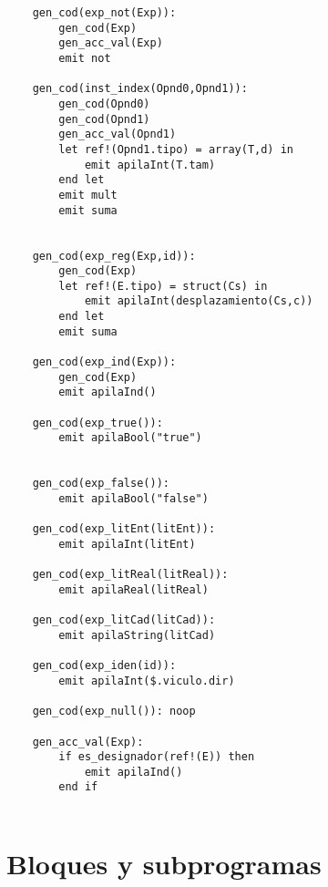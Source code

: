 \begin{lstlisting}
    gen_cod(exp_not(Exp)):
        gen_cod(Exp)
        gen_acc_val(Exp)
        emit not

    gen_cod(inst_index(Opnd0,Opnd1)):
        gen_cod(Opnd0)
        gen_cod(Opnd1)
        gen_acc_val(Opnd1)
        let ref!(Opnd1.tipo) = array(T,d) in
            emit apilaInt(T.tam)
        end let
        emit mult
        emit suma


    gen_cod(exp_reg(Exp,id)):
        gen_cod(Exp)
        let ref!(E.tipo) = struct(Cs) in
            emit apilaInt(desplazamiento(Cs,c))
        end let
        emit suma

    gen_cod(exp_ind(Exp)):
        gen_cod(Exp)
        emit apilaInd()

    gen_cod(exp_true()):
        emit apilaBool("true")


    gen_cod(exp_false()):
        emit apilaBool("false")

    gen_cod(exp_litEnt(litEnt)):
        emit apilaInt(litEnt)

    gen_cod(exp_litReal(litReal)):
        emit apilaReal(litReal)

    gen_cod(exp_litCad(litCad)):
        emit apilaString(litCad)

    gen_cod(exp_iden(id)):
        emit apilaInt($.viculo.dir)

    gen_cod(exp_null()): noop

    gen_acc_val(Exp):
        if es_designador(ref!(E)) then
            emit apilaInd()
        end if


\end{lstlisting}

\section{Bloques y subprogramas}


